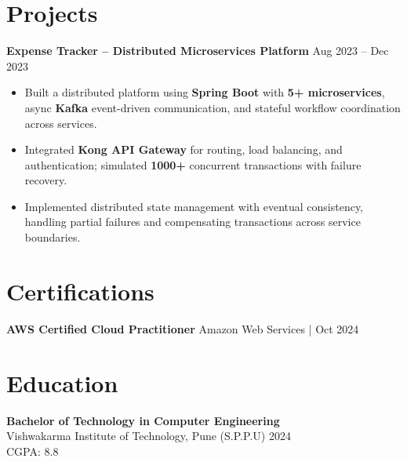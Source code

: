 \documentclass[a4paper,10pt]{article}
\begin{document}
\section*{Projects}

\textbf{Expense Tracker -- Distributed Microservices Platform} \hfill Aug 2023 -- Dec 2023
\begin{itemize}[leftmargin=*]
    \item Built a distributed platform using \textbf{Spring Boot} with \textbf{5+ microservices}, async \textbf{Kafka} event-driven communication, and stateful workflow coordination across services.
    \item Integrated \textbf{Kong API Gateway} for routing, load balancing, and authentication; simulated \textbf{1000+} concurrent transactions with failure recovery.
    \item Implemented distributed state management with eventual consistency, handling partial failures and compensating transactions across service boundaries.
\end{itemize}

\section*{Certifications}
\textbf{AWS Certified Cloud Practitioner} \hfill Amazon Web Services \;|\; Oct 2024 \\

\section*{Education}

\textbf{Bachelor of Technology in Computer Engineering} \\
Vishwakarma Institute of Technology, Pune (S.P.P.U) \hfill 2024 \\
CGPA: 8.8
\end{document}
